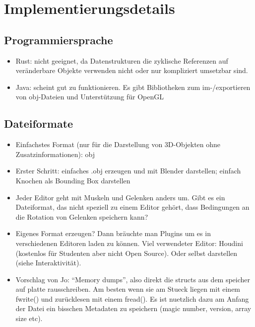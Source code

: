 \chapter{Implementierungsdetails}

\section{Programmiersprache}

\begin{itemize}
 \item Rust: nicht geeignet, da Datenstrukturen die zyklische Referenzen auf veränderbare Objekte verwenden nicht oder nur kompliziert umsetzbar sind.
 \item Java: scheint gut zu funktionieren. Es gibt Bibliotheken zum im-/exportieren von obj-Dateien und Unterstützung für OpenGL
\end{itemize}


\section{Dateiformate}

\begin{itemize}
 \item Einfachstes Format (nur für die Darstellung von 3D-Objekten ohne Zusatzinformationen): obj
 \item Erster Schritt: einfaches .obj erzeugen und mit Blender darstellen; einfach Knochen als Bounding Box darstellen
 \item Jeder Editor geht mit Muskeln und Gelenken anders um. Gibt es ein Dateiformat, das nicht speziell zu einem Editor gehört, dass Bedingungen an die Rotation von Gelenken speichern kann?
 \item Eigenes Format erzeugen? Dann bräuchte man Plugins um es in verschiedenen Editoren laden zu können. Viel verwendeter Editor: Houdini (kostenlos für Studenten aber nicht Open Source). Oder selbst darstellen (siehe Interaktivität).
\item Vorschlag von Jo: "`Memory dumps"', also direkt die structs aus dem speicher auf platte rausschreiben. Am besten wenn sie am Stueck liegen mit einem fwrite() und zurücklesen mit einem fread(). Es ist nuetzlich dazu am Anfang der Datei ein bisschen Metadaten zu speichern (magic number, version, array size etc).
\end{itemize}

